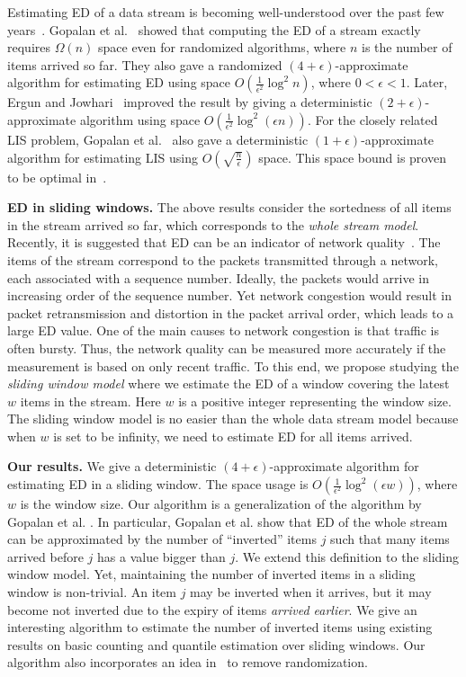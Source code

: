 \documentclass{llncs}
\newcommand{\runtitle}[1]{{\small \textbf{\boldmath #1}}}
\newcommand{\eps}{\epsilon}
\begin{document}
Estimating ED of a data stream is becoming well-understood
over the past few years~\cite{ErJ08,GaG07,GJK+07}.
Gopalan et al.~\cite{GJK+07} showed that computing the ED of a stream
exactly requires $\Omega(n)$ space even for randomized algorithms,
where $n$ is the number of items arrived so far.
They also gave a randomized $(4+\eps)$-approximate algorithm
for estimating ED using space $O(\frac{1}{\eps^2} \log^2 n)$,
where $0 < \eps < 1$.
Later, Ergun and Jowhari~\cite{ErJ08} improved the result
by giving a deterministic $(2+\eps)$-approximate algorithm
using space $O(\frac{1}{\eps^2} \log^2(\eps n))$.
For the closely related LIS problem,
Gopalan et al.~\cite{GJK+07} also gave a deterministic
$(1+\eps)$-approximate algorithm for estimating LIS
using $O(\sqrt{\frac{n}{\eps}})$ space.
This space bound is proven to be optimal in~\cite{GaG07}.


\runtitle{ED in sliding windows.}
The above results consider the sortedness of all items in the stream
arrived so far, which corresponds to the \emph{whole stream model}.
Recently, it is suggested that ED can be an indicator of
network quality~\cite{GKT10}. The items of the stream correspond to
the packets transmitted through a network,
each associated with a sequence number. Ideally, the
packets would arrive in increasing order of the sequence number.
Yet network congestion would result in packet retransmission
and distortion in the packet arrival order, which leads
to a large ED value.
One of the main causes to network congestion is
that traffic is often bursty.
Thus, the network quality can be measured more accurately
if the measurement is based on only recent traffic.
To this end, we propose studying the \emph{sliding window model} where
we estimate the ED of a window covering the latest $w$ items in the stream.
Here $w$ is a positive integer representing the window size.
The sliding window model is no easier than the whole data stream model because
when $w$ is set to be infinity, we need to estimate
ED for all items arrived.

\runtitle{Our results.}
We give a deterministic $(4+\epsilon)$-approximate algorithm
for estimating ED in a sliding window. The space usage is
$O( \frac{1}{\epsilon^2}\log^2(\epsilon w))$, where $w$ is
the window size.
Our algorithm is a generalization
of the algorithm by Gopalan et al. \cite{GJK+07}.
In particular, Gopalan et al. show that ED of the whole stream
can be approximated by the number of ``inverted'' items $j$ such that many items
arrived before $j$ has a value bigger than $j$.
We extend this definition
to the sliding window model. Yet, maintaining the number
of inverted items in a sliding window is non-trivial.
An item $j$ may be inverted when it arrives, but it may
become not inverted due to the expiry of items \emph{arrived earlier}.
We give an interesting algorithm to estimate the number of inverted items
using existing results
on basic counting and quantile estimation over sliding windows.
Our algorithm also incorporates an idea in~\cite{ErJ08}
to remove randomization.
\end{document}
